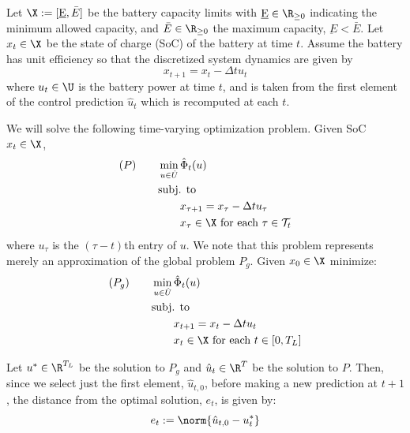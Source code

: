 \documentclass{homework}
\begin{document}
Let $\X:=[\underbar{E}, \bar{E}]$ be the battery capacity limits with $\underbar{E}\in\R_{\geq0}$
indicating the minimum allowed capacity, and $\bar{E}\in\R_{\geq0}$ the maximum capacity,
$\underbar{E} < \bar{E}$.
Let $x_t\in\X$ be the state of charge (SoC) of the battery at time $t$. Assume the battery has
unit efficiency so that the discretized system dynamics are given by
\begin{equation*}
    x_{t+1} = x_t - \Delta t u_t
\end{equation*}
where $u_t\in\U$ is the battery power at time $t$, and is taken from the first element
of the control prediction $\hat{u}_t$ which is recomputed at each $t$.

We will solve the following time-varying optimization problem. Given SoC $x_t \in \X$,
\begin{align*}
    (P) \qquad &\min_{u \in \hat{U}} \hat{\Phi}_t(u) \\
        & \text{subj. to} \\
        & \qquad x_{\tau + 1} = x_\tau - \Delta t u_\tau \\
        & \qquad x_\tau \in \X \text{ for each } \tau \in \mathcal{T}_t
\end{align*}
where $u_\tau$ is the $(\tau - t)$th entry of $u$. We note that this problem represents
merely an approximation of the global problem $P_g$. Given $x_0 \in \X$ minimize:
\begin{align*}
    (P_g) \qquad &\min_{u \in \hat{U}} \hat{\Phi}_t(u) \\
        & \text{subj. to} \\
        & \qquad x_{t + 1} = x_t - \Delta t u_t \\
        & \qquad x_t \in \X \text{ for each } t \in [0, T_L]
\end{align*}

Let $u^* \in \R^{T_L}$ be the solution to $P_g$ and $\hat{u}_t \in \R^T$ be the solution
to $P$. Then, since we select just the first element, $\hat{u}_{t,0}$, before making a new
prediction at $t+1$, the distance from the optimal solution, $e_t$, is given by:
\begin{equation*}
    e_t := \norm{\hat{u}_{t,0} - u_t^*}
\end{equation*}
\end{document}
